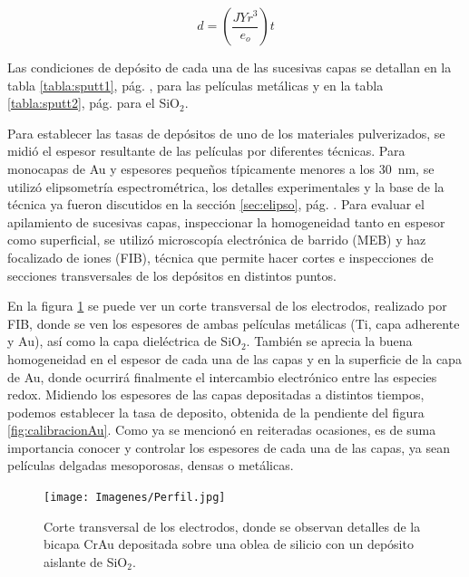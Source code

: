 {	 			\begin{equation}
	 				d=\left(\frac{JYr^3}{e_o}\right)t
	 				\label{eq:sputt}
	 			\end{equation}

		 Las condiciones de depósito de cada una de las sucesivas capas se detallan en la tabla \ref{tabla:sputt1}, pág. \pageref{tabla:sputt1}, para las películas metálicas y en la tabla  \ref{tabla:sputt2}, pág. \pageref{tabla:sputt2} para el SiO$_2$. 


		 Para establecer las tasas de depósitos de uno de los materiales pulverizados, se midió el espesor resultante de las películas por diferentes técnicas. Para monocapas de Au y espesores pequeños típicamente menores a los \SI{30}{\nm}, se utilizó elipsometría espectrométrica, los detalles experimentales y la base de la técnica ya fueron discutidos en la sección \ref{sec:elipso}, pág. \pageref{sec:elipso}. Para evaluar el apilamiento de sucesivas capas, inspeccionar la homogeneidad tanto en espesor como superficial, se utilizó microscopía electrónica de barrido (MEB) y haz focalizado de iones (FIB), técnica que permite hacer cortes e inspecciones de secciones transversales de los depósitos en distintos puntos. 
		
		 En la figura \ref{fig:FIB_electrodos} se puede ver un corte transversal de los electrodos, realizado por FIB, donde se ven los espesores de ambas películas metálicas (Ti, capa adherente y Au), así como la capa dieléctrica de SiO$_2$. También se aprecia la buena homogeneidad en el espesor de cada una de las capas y en la superficie de la capa de Au, donde ocurrirá finalmente el intercambio electrónico entre las especies redox. Midiendo los espesores de las capas depositadas a distintos tiempos, podemos establecer la tasa de deposito, obtenida de la pendiente del figura \ref{fig:calibracionAu}. Como ya se mencionó en reiteradas ocasiones, es de suma importancia conocer y controlar los espesores de cada una de las capas, ya sean películas delgadas mesoporosas, densas o metálicas.


						  \begin{figure}[h!]
						  \begin{center}
						  \texttt{[image: Imagenes/Perfil.jpg]}
						  \caption[Sección trasversal de los eletrodos]{Corte transversal de los electrodos, donde se observan detalles de la bicapa Cr\textbar Au depositada sobre una oblea de silicio con un depósito aislante de SiO$_2$.}
						  \label{fig:FIB_electrodos}
						  \end{center}
						  \end{figure} 	

}
